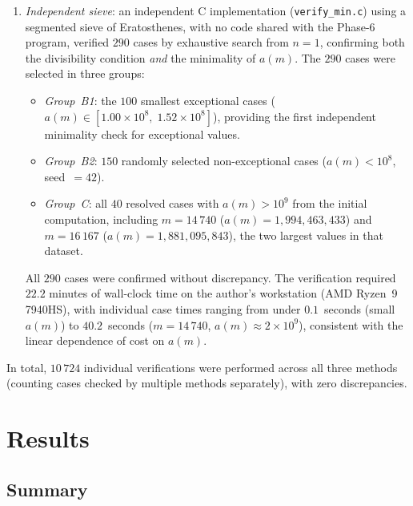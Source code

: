 \documentclass[12pt]{article}
\begin{document}
\begin{enumerate}
		An independent minimality check for these $36$ cases (e.g., by
		extending \texttt{verify\_min.c} to cover the extended-search range)
		is planned as future work.
		\item \emph{Independent sieve}: an independent C implementation
		(\texttt{verify\_min.c}) using a segmented sieve of Eratosthenes,
		with no code shared with the Phase-6 program, verified $290$ cases
		by exhaustive search from $n = 1$, confirming both the divisibility
		condition \emph{and} the minimality of $a(m)$.
		The $290$ cases were selected in three groups:
		\begin{itemize}
			\item \emph{Group~B1}: the $100$ smallest exceptional cases
			($a(m) \in [1.00 \times 10^8,\; 1.52 \times 10^8]$), providing
			the first independent minimality check for exceptional values.
			\item \emph{Group~B2}: $150$ randomly selected non-exceptional
			cases ($a(m) < 10^8$, seed~$= 42$).
			\item \emph{Group~C}: all $40$ resolved cases with
			$a(m) > 10^9$ from the initial computation, including
			$m = 14\,740$
			($a(m) = 1{,}994{,}463{,}433$) and $m = 16\,167$
			($a(m) = 1{,}881{,}095{,}843$), the two largest values in
			that dataset.
		\end{itemize}
		All $290$ cases were confirmed without discrepancy.
		The verification required $22.2$ minutes of wall-clock time on the
		author's workstation (AMD Ryzen~9 7940HS), with individual case
		times ranging from under $0.1$~seconds (small $a(m)$) to
		$40.2$~seconds ($m = 14\,740$, $a(m) \approx 2 \times 10^9$),
		consistent with the linear dependence of cost on $a(m)$.
	\end{enumerate}
	
	In total, $10\,724$ individual verifications were performed across all
	three methods (counting cases checked by multiple methods separately),
	with zero discrepancies.
	
	\section{Results}
	
	\subsection{Summary}
	
\end{document}
